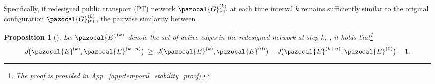 \documentclass[a4paper,fleqn]{cas-sc}
\newtheorem{proposition}{Proposition}
\begin{document}
Specifically, if redesigned public transport (PT) network $\pazocal{G}_\text{PT}^{(k)}$ at each time interval $k$ remains sufficiently similar to the original configuration $\pazocal{G}_\text{PT}^{(0)}$,
the pairwise similarity between 
%
\begin{proposition}[]
\label{prop:temporal_stability}
Let $\pazocal{E}^{(k)}$ denote the set of active edges in the redesigned network at step $k$, , it holds that\footnote{The proof is provided in App.~\ref{app:temporal_stability_proof}.}
\[
J\!\bigl(\pazocal{E}^{(k)},\pazocal{E}^{(k+n)}\bigr) \;\ge\; J\!\bigl(\pazocal{E}^{(k)},\pazocal{E}^{(0)}\bigr) + J\!\bigl(\pazocal{E}^{(k+n)},\pazocal{E}^{(0)}\bigr) - 1.
\]
\end{proposition}

\end{document}
